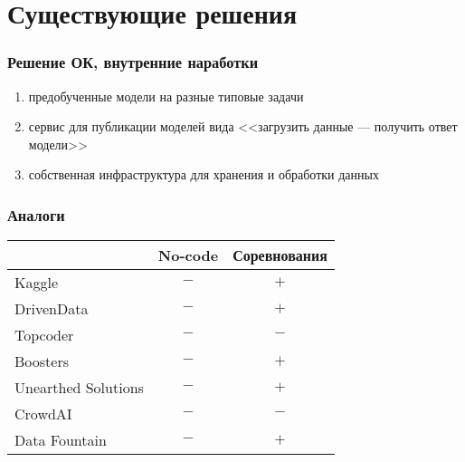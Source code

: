 \section{Существующие решения}

\begin{frame}
\frametitle{Решение ОК, внутренние наработки}
\begin{enumerate}
    \item предобученные модели на разные типовые задачи
    \item сервис для публикации моделей вида <<загрузить данные --- получить ответ модели>>
    \item собственная инфраструктура для хранения и обработки данных
\end{enumerate}
\end{frame}

\begin{frame}
\frametitle{Аналоги}
\begin{center}
	\begin{tabular}{l|cc}
		& No-code & Соревнования \\
		\hline
		Kaggle              & $-$ & $+$ \\
		DrivenData          & $-$ & $+$ \\
		Topcoder            & $-$ & $-$ \\ %
		Boosters            & $-$ & $+$ \\
		Unearthed Solutions & $-$ & $+$ \\ %
		CrowdAI             & $-$ & $-$ \\
		Data Fountain       & $-$ & $+$ \\
	\end{tabular}
\end{center}
\end{frame}
